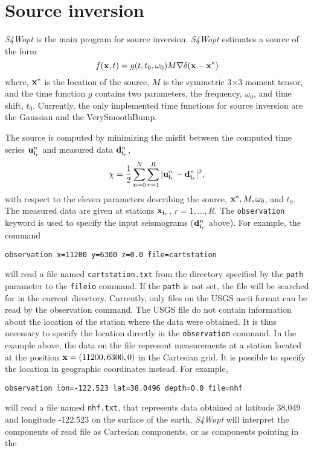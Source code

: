 \documentclass[11pt]{report}
\begin{document}
\chapter{Source inversion}
\emph{S4Wopt} is the main program for source inversion. \emph{S4Wopt} estimates a source of the form
$$
 f({\bf x},t) =  g(t,t_0,\omega_0)M\nabla\delta({\bf x}-{\bf x}^*)
$$
where, ${\bf x}^*$ is the location of the source, $M$ is the symmetric 3$\times$3 moment tensor, and the time
function $g$ contains two parameters, the frequency, $\omega_0$, and time shift, $t_0$. Currently, the only
implemented time functions for source inversion are the Gaussian and the VerySmoothBump.
\par
The source is computed by minimizing the misfit between the computed time series ${\bf u}^n_{{\bf i}_r}$ and measured 
data ${\bf d}^n_{{\bf i}_r}$,
$$
 \chi = \frac{1}{2}\sum_{n=0}^N \sum_{r=1}^R |{\bf u}^n_{{\bf i}_r}-{\bf d}^n_{{\bf i}_r}|^2,
$$
with respect to the eleven parameters describing the source, ${\bf x}^*, M, \omega_0$, and $t_0$.
The measured data are given at stations ${\bf x}_{{\bf i}_r}$, $r=1,\ldots,R$.
The {\tt observation} keyword is used to specify the input seismograms (${\bf d}^n_{{\bf i}_r}$ above). 
For example, the command
%
\begin{verbatim}
observation x=11200 y=6300 z=0.0 file=cartstation
\end{verbatim}
%
will read a file named {\tt cartstation.txt} from the directory specified by the {\tt path} parameter to the {\tt fileio}
command. If the {\tt path} is not set, the file will be searched for in the current directory. Currently, only files on
the USGS ascii format can be read by the observation command. The USGS file do not contain information about the
location of the station where the data were obtained. It is thus necessary to specify the location directly
in the {\tt observation} command. In the example above, the data on the file represent measurements at a 
station located at the position ${\bf x} =  (11200,6300,0)$ in the Cartesian grid. It is possible to specify the
location in geographic coordinates instead. For example,
%
\begin{verbatim}
observation lon=-122.523 lat=38.0496 depth=0.0 file=nhf 
\end{verbatim}
%
will read a file named {\tt nhf.txt}, that represents data obtained at latitude 38.049 and longitude -122.523 on 
the surface of the earth.
\emph{S4Wopt} will interpret the components of read file as Cartesian components, or as components pointing in the 
\end{document}
